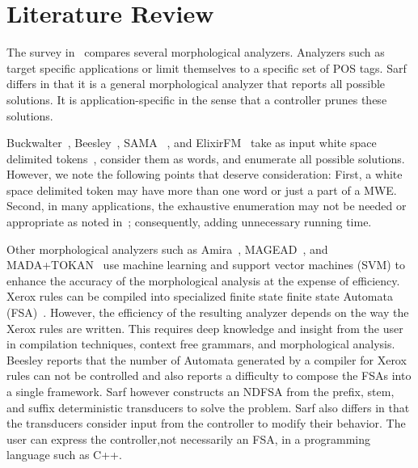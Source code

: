 \documentclass[a4,12pt]{report}
\begin{document}
\chapter{Literature Review}
\label{sec:literature}

The survey in~\cite{Sughaiyer:04} compares
several morphological analyzers. 
Analyzers such as~\cite{Khoja:01,Darwish:02} 
target specific applications 
or limit themselves to a specific set of POS tags. 
Sarf differs in that it is a general morphological 
analyzer that reports all possible solutions. 
It is application-specific in the sense that a controller 
prunes these solutions. 

Buckwalter~\cite{Buckwalter:02},
Beesley~\cite{Beesley:01},
SAMA ~\cite{Kulick:10},
and ElixirFM~\cite{Otakar:07} 
take as input white space delimited tokens~\cite{Kulick:10},
consider them as words,
and enumerate all possible solutions. 
However, we note the following points that deserve consideration:
First, a white space delimited token may have 
more than one word or just a part of a MWE.
Second, in many applications, the exhaustive enumeration may not be needed or appropriate as 
noted in~\cite{Maamouri:10}; consequently, adding unnecessary running time.

Other morphological analyzers such as 
Amira~\cite{Diab:07,Benajiba:07},
MAGEAD~\cite{Habash:05}, and MADA+TOKAN~\cite{Habash:09} 
use machine learning and support vector machines (SVM) 
to enhance the accuracy of the morphological analysis at the expense 
of efficiency.
Xerox rules can be compiled into specialized finite state
finite state Automata (FSA)~\cite{Beesley:03}.
However, the efficiency of the resulting analyzer depends on the
way the Xerox rules are written. 
This requires deep knowledge and insight from the user
in compilation techniques, context free grammars, 
and morphological analysis.
Beesley reports that the number of Automata generated by a compiler
for Xerox rules can not be controlled and also reports a difficulty 
to compose the FSAs into a single framework. 
Sarf however constructs an NDFSA from 
the prefix, stem, and suffix deterministic 
transducers to solve the problem.
Sarf also differs in that 
the transducers consider
input from the controller to modify their behavior.
The user can express the controller,not necessarily an FSA, in a programming language such as C++.
\end{document}

